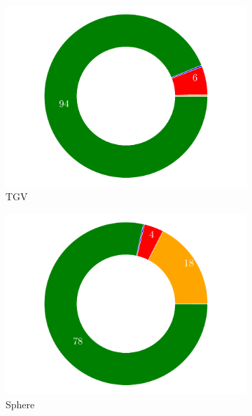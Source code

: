 \documentclass[final,3p,times]{elsarticle}
\begin{document}
\begin{figure}[!t]
  \centering
  \begin{subfigure}[t]{0.33\linewidth}
      \centering
      \includegraphics[width=\linewidth]{img/tgv_profile.pdf}
      \caption{TGV}
  \end{subfigure}
  \begin{subfigure}[t]{0.33\linewidth}
    \centering
    \includegraphics[width=\linewidth]{img/sphere_profile.pdf}
    \caption{Sphere}
  \end{subfigure}
  \begin{subfigure}[t]{0.33\linewidth}
    \centering
\end{subfigure}
\end{figure}
\end{document}
